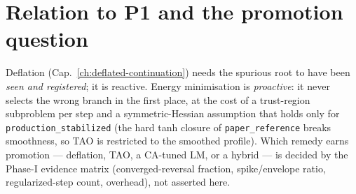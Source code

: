 \section{Relation to P1 and the promotion question}

Deflation (Cap.~\ref{ch:deflated-continuation}) needs the spurious root to
have been \emph{seen and registered}; it is reactive. Energy minimisation
is \emph{proactive}: it never selects the wrong branch in the first
place, at the cost of a trust-region subproblem per step and a
symmetric-Hessian assumption that holds only for
\texttt{production\_stabilized} (the hard tanh closure of
\texttt{paper\_reference} breaks smoothness, so TAO is restricted to the
smoothed profile). Which remedy earns promotion --- deflation, TAO, a
CA-tuned LM, or a hybrid --- is decided by the Phase-I evidence matrix
(converged-reversal fraction, spike/envelope ratio, regularized-step
count, overhead), not asserted here.
